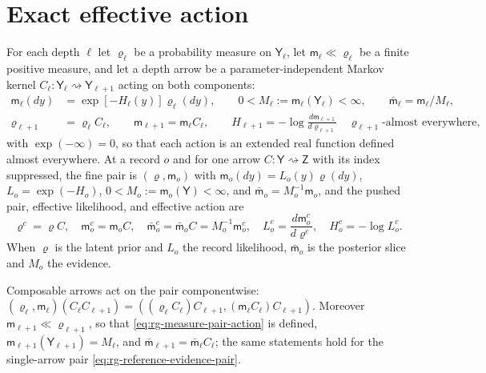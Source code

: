 \section{Exact effective action}
\label{sec:rg-effective-action}
\label{sec:rg-measure-pair-arrows}

For each depth $\ell$ let $\varrho_\ell$ be a probability measure on
$\mathsf Y_\ell$, let $\mathsf m_\ell\ll\varrho_\ell$ be a finite positive measure,
and let a depth arrow be a parameter-independent Markov kernel
$C_\ell:\mathsf Y_\ell\rightsquigarrow\mathsf Y_{\ell+1}$ acting on both components:
\begin{align}
\mathsf m_\ell(dy)&=\exp[-H_\ell(y)]\varrho_\ell(dy),
\qquad
0<M_\ell:=\mathsf m_\ell(\mathsf Y_\ell)<\infty,
\qquad
\bar{\mathsf m}_\ell=\mathsf m_\ell/M_\ell,
\label{eq:rg-measure-pair-normalization}\\
\varrho_{\ell+1}&=\varrho_\ell C_\ell,
\qquad
\mathsf m_{\ell+1}=\mathsf m_\ell C_\ell,
\qquad
H_{\ell+1}=-\log\frac{d\mathsf m_{\ell+1}}{d\varrho_{\ell+1}}
\quad\varrho_{\ell+1}\text{-almost everywhere},
\label{eq:rg-measure-pair-action}
\end{align}
with $\exp(-\infty)=0$, so that each action is an extended real function defined
almost everywhere. At a record $o$ and for one arrow
$C:\mathsf Y\rightsquigarrow\mathsf Z$ with its index suppressed, the fine pair is
$(\varrho,\mathsf m_o)$ with $\mathsf m_o(dy)=L_o(y)\varrho(dy)$,
$L_o=\exp(-H_o)$, $0<M_o:=\mathsf m_o(\mathsf Y)<\infty$, and
$\bar{\mathsf m}_o=M_o^{-1}\mathsf m_o$, and the pushed pair, effective likelihood,
and effective action are
\begin{equation}
\varrho^c=\varrho C,
\quad
\mathsf m_o^c=\mathsf m_oC,
\quad
\bar{\mathsf m}_o^c=\bar{\mathsf m}_oC=M_o^{-1}\mathsf m_o^c,
\quad
L_o^c=\frac{d\mathsf m_o^c}{d\varrho^c},
\quad
H_o^c=-\log L_o^c.
\label{eq:rg-reference-evidence-pair}
\end{equation}
When $\varrho$ is the latent prior and $L_o$ the record likelihood,
$\bar{\mathsf m}_o$ is the posterior slice and $M_o$ the evidence.

Composable arrows act on the pair componentwise:
$(\varrho_\ell,\mathsf m_\ell)(C_\ell C_{\ell+1})
=((\varrho_\ell C_\ell)C_{\ell+1},(\mathsf m_\ell C_\ell)C_{\ell+1})$. Moreover
$\mathsf m_{\ell+1}\ll\varrho_{\ell+1}$, so that
\eqref{eq:rg-measure-pair-action} is defined, $\mathsf m_{\ell+1}(\mathsf
Y_{\ell+1})=M_\ell$, and $\bar{\mathsf m}_{\ell+1}=\bar{\mathsf m}_\ell C_\ell$; the
same statements hold for the single-arrow pair
\eqref{eq:rg-reference-evidence-pair}. 

